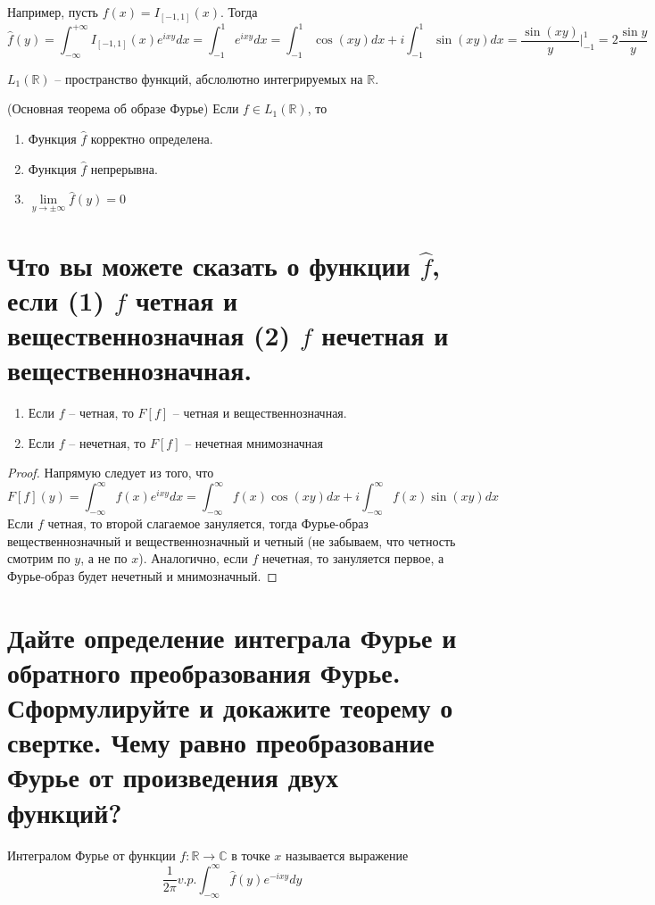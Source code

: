 Например, пусть $f(x) = I_{[-1, 1]}(x)$. Тогда
$$
    \hat{f}(y) = \int_{-\infty}^{+\infty}I_{[-1, 1]}(x)e^{ixy}dx = \int_{-1}^{1}e^{ixy}dx = \int_{-1}^{1}\cos(xy)dx + i\int_{-1}^{1}\sin(xy)dx = \frac{\sin(xy)}{y}\Big|_{-1}^{1} = 2\frac{\sin y}{y}
$$

\begin{definition}
    $L_1(\mathbb{R})$ -- пространство функций, абслолютно интегрируемых на $\mathbb{R}$.
\end{definition}

\begin{theorem} (Основная теорема об образе Фурье)
    Если $f\in L_1(\mathbb{R})$, то
    \begin{enumerate}
        \item Функция $\hat{f}$ корректно определена.
        \item Функция $\hat{f}$ непрерывна.
        \item $\lim\limits_{y\to\pm\infty}\hat{f}(y) = 0$
    \end{enumerate}
\end{theorem}

\section{Что вы можете сказать о функции $\hat{f}$, если (1) $f$ четная и вещественнозначная (2) $f$ нечетная и вещественнозначная.}
\begin{lemma}
    \begin{enumerate}
        \item Если $f$ -- четная, то $F[f]$ -- четная и вещественнозначная.
        \item Если $f$ -- нечетная, то $F[f]$ -- нечетная мнимозначная
    \end{enumerate}
\end{lemma}

\begin{proof}
    Напрямую следует из того, что
    $$
    F[f](y) = \int_{-\infty}^{\infty}f(x)e^{ixy}dx
    =
    \int_{-\infty}^{\infty}f(x)\cos(xy)dx + i\int_{-\infty}^{\infty}f(x)\sin(xy)dx
    $$
    Если $f$ четная, то второй слагаемое зануляется, тогда Фурье-образ вещественнозначный и вещественнозначный и четный (не забываем, что четность смотрим по $y$, а не по $x$). Аналогично, если $f$ нечетная, то зануляется первое, а Фурье-образ будет нечетный и мнимозначный.
\end{proof}

\section{Дайте определение интеграла Фурье и обратного преобразования Фурье. Сформулируйте и докажите теорему о свертке. Чему равно преобразование Фурье от произведения двух функций?}
\begin{definition}
    Интегралом Фурье от функции $f\colon \mathbb{R}\to\mathbb{C}$ в точке $x$ называется выражение $$\frac{1}{2\pi} v.p.\int_{-\infty}^{\infty}\hat{f}(y)e^{-ixy}dy$$
\end{definition}

